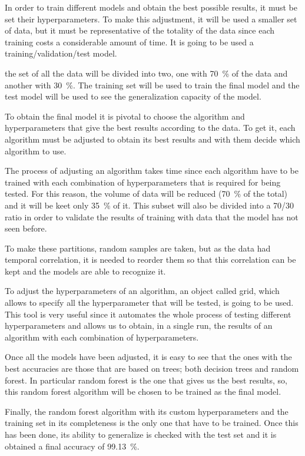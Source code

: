  In order to train different models and obtain the best possible results, it must be set their hyperparameters. To make this adjustment, it will be used a smaller set of data, but it must be representative of the totality of the data since each training costs a considerable amount of time. It is going to be used a training/validation/test model.


the set of all the data will be divided into two, one with \SI{70}{\percent} of the data and another with \SI{30}{\percent}. The training set will be used to train the final model and the test model will be used to see the generalization capacity of the model.


To obtain the final model it is pivotal to choose the algorithm and hyperparameters that give the best results according to the data. To get it, each algorithm must be adjusted to obtain its best results and with them decide which algorithm to use.


The process of adjusting an algorithm takes time since each algorithm have to be trained with each combination of hyperparameters that is required for being tested. For this reason, the volume of data will be reduced (\SI{70}{\percent} of the total) and it will be keet only \SI{35}{\percent} of it. This subset will also be divided into a 70/30 ratio in order to validate the results of training with data that the model has not seen before.


To make these partitions, random samples are taken, but as the data had temporal correlation, it is needed to reorder them so that this correlation can be kept and the models are able to recognize it. 


To adjust the hyperparameters of an algorithm, an object called grid, which allows to specify all the hyperparameter that will be tested, is going to be used. This tool is very useful since it automates the whole process of testing different hyperparameters and allows us to obtain, in a single run, the results of an algorithm with each combination of hyperparameters.


Once all the models have been adjusted, it is easy to see that the ones with the best accuracies are those that are based on trees; both decision trees and random forest. In particular random forest is the one that gives us the best results, so, this random forest algorithm will be chosen to be trained as the final model. 


Finally, the random forest algorithm with its custom hyperparameters and the training set in its completeness is the only one that have to be trained. Once this has been done, its ability to generalize is checked with the test set and it is obtained a final accuracy of \SI{99.13}{\percent}. 


